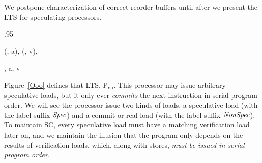 We postpone characterization of correct reorder buffers until after we
present the LTS for speculating processors.

\begin{figure*}[t]
\small
\centering
\begin{boxedminipage}[c]{.95\textwidth}
\inference[Fetch]
{}
{}

\inference[Compute]
{\get\spc\ld(\rob) = \epsilon}
{}

{
{(\ld\req, a), (\ld\resp, v), \Spec}}


{}

{}

{}

{
{\st, a, v}}

{}

{}
\end{boxedminipage}

\caption{Speculating, out-of-order issue processor}
\label{Ooo}
\end{figure*}

Figure~\ref{Ooo} defines that LTS,
P$_{\texttt{so}}$. This processor may issue arbitrary speculative
loads, but it only ever \emph{commits} the next instruction in serial
program order. 
We will see the processor issue two kinds of loads, a speculative load (with
the label suffix $\mathit{Spec}$) and a commit or real load (with the label suffix $\mathit{NonSpec}$).  To
maintain SC, every speculative
load must have a matching verification load later on, and we maintain
the illusion that the program only depends on the results of
verification loads, which, along with stores, \emph{must be issued in
serial program order}.

